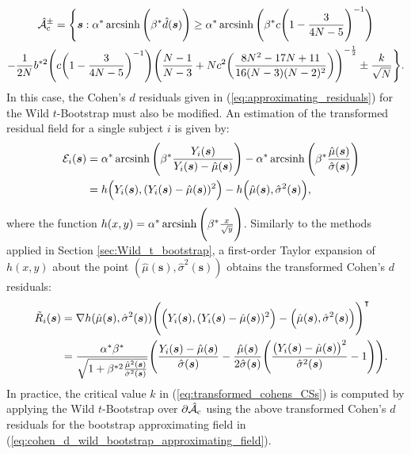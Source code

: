 \begin{multline}
\label{eq:transformed_cohens_CSs}
    \operatorname{\hat{\mathcal{A}}_{c}^\pm} = \Bigg\{\bm{s} : \alpha^{*} \operatorname{arcsinh}\Bigg(\beta^{*} \hat{d}(\bm{s}) \Bigg) \geq \alpha^{*} \operatorname{arcsinh}\Bigg(\beta^{*} c \Bigg(1 - \frac{3}{4N -5}\Bigg)^{-1} \Bigg) \\
    - \frac{1}{2N}b^{*2}\Bigg(c \bigg(1 - \frac{3}{4N - 5}\bigg)^{-1} \Bigg)\Bigg(\frac{N-1}{N-3} + N c^{2} \bigg(\frac{8N^{2} - 17N + 11}{16(N-3)(N-2)^{2}} \bigg)\Bigg)^{-\frac{1}{2}} \pm \frac{k}{\sqrt{N}} \Bigg\}. 
\end{multline}
In this case, the Cohen's $d$ residuals given in (\ref{eq:approximating_residuals}) for the Wild $t$-Bootstrap must also be modified. An estimation of the transformed residual field for a single subject $i$ is given by: 
\begin{alignat}{4}
\label{eq:single_subject_transformed_residuals}
&&\mathcal{E}_{i}(\bm{s})
& = \alpha^{*} \operatorname{arcsinh}\Bigg(\beta^{*} \frac{Y_{i}(\bm{s})}{Y_{i}(\bm{s}) - \hat{\mu}(\bm{s})} \Bigg) - \alpha^{*} \operatorname{arcsinh}\Bigg(\beta^{*} \frac{\hat{\mu}(\bm{s})}{\hat{\sigma}(\bm{s})} \Bigg)\notag\\
&
&
&= h\Big(Y_{i}(\bm{s}),(Y_{i}(\bm{s}) - \hat{\mu}(\bm{s}))^{2}\Big) - h\Big(\hat{\mu}(\bm{s}), \hat{\sigma}^{2}(\bm{s})\Big),
\end{alignat}
where the function $h(x,y) =  \alpha^{*} \operatorname{arcsinh}\Bigg(\beta^{*} \frac{x}{\sqrt{y}}\Bigg)$. Similarly to the methods applied in Section \ref{sec:Wild_t_bootstrap}, a first-order Taylor expansion of $h(x,y)$ about the point $(\hat{\mu}(\bm{s}), \hat{\sigma}^{2}(\bm{s}))$ obtains the transformed Cohen's $d$ residuals:
\begin{alignat}{4}
\label{eq:transformed_approximating_residuals}
&&\tilde{R}_{i}(\bm{s})
&= \nabla h(\hat{\mu}(\bm{s}),\hat{\sigma}^{2}(\bm{s}))\Bigg( \Big(Y_{i}(\bm{s}),(Y_{i}(\bm{s}) - \hat{\mu}(\bm{s}))^{2}\Big) - \Big(\hat{\mu}(\bm{s}), \hat{\sigma}^{2}(\bm{s}) \Big) \Bigg)^{\intercal}\notag\\
&
&
&= \frac{\alpha^{*}\beta^{*}}{\sqrt{1 + \beta^{*2}\frac{\hat{\mu}^{2}(\bm{s})}{\hat{\sigma}^{2}(\bm{s})}}} \Bigg(\frac{Y_{i}(\bm{s}) - \hat{\mu}(\bm{s})}{\hat{\sigma}(\bm{s})} - \frac{\hat{\mu}(\bm{s})}{2\hat{\sigma}(\bm{s})}\Bigg( \frac{\big(Y_{i}(\bm{s}) - \hat{\mu}(\bm{s})\big)^{2}}{\hat{\sigma}^{2}(\bm{s})} - 1 \Bigg)\Bigg).
\end{alignat}
In practice, the critical value $k$ in (\ref{eq:transformed_cohens_CSs}) is computed by applying the Wild $t$-Bootstrap over $\operatorname{\partial\hat{\mathcal{A}}_{c}}$ using the above transformed Cohen's $d$ residuals for the bootstrap approximating field in (\ref{eq:cohen_d_wild_bootstrap_approximating_field}). 

